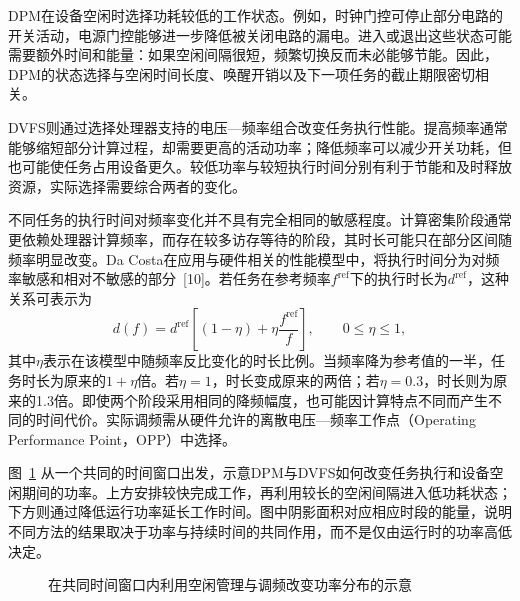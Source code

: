 DPM在设备空闲时选择功耗较低的工作状态。例如，时钟门控可停止部分电路的开关活动，电源门控能够进一步降低被关闭电路的漏电。进入或退出这些状态可能需要额外时间和能量：如果空闲间隔很短，频繁切换反而未必能够节能。因此，DPM的状态选择与空闲时间长度、唤醒开销以及下一项任务的截止期限密切相关。

DVFS则通过选择处理器支持的电压—频率组合改变任务执行性能。提高频率通常能够缩短部分计算过程，却需要更高的活动功率；降低频率可以减少开关功耗，但也可能使任务占用设备更久。较低功率与较短执行时间分别有利于节能和及时释放资源，实际选择需要综合两者的变化。

不同任务的执行时间对频率变化并不具有完全相同的敏感程度。计算密集阶段通常更依赖处理器计算频率，而存在较多访存等待的阶段，其时长可能只在部分区间随频率明显改变。Da Costa在应用与硬件相关的性能模型中，将执行时间分为对频率敏感和相对不敏感的部分~[10]。若任务在参考频率$f^{\mathrm{ref}}$下的执行时长为$d^{\mathrm{ref}}$，这种关系可表示为
\begin{equation}\label{eq:ch2-response}
  d(f)=d^{\mathrm{ref}}\left[(1-\eta)+\eta\frac{f^{\mathrm{ref}}}{f}\right],
  \qquad 0\le\eta\le1,
\end{equation}
其中$\eta$表示在该模型中随频率反比变化的时长比例。当频率降为参考值的一半，任务时长为原来的$1+\eta$倍。若$\eta=1$，时长变成原来的两倍；若$\eta=0.3$，时长则为原来的1.3倍。即使两个阶段采用相同的降频幅度，也可能因计算特点不同而产生不同的时间代价。实际调频需从硬件允许的离散电压—频率工作点（Operating Performance Point，OPP）中选择。

图~\ref{fig:ch2_power_control} 从一个共同的时间窗口出发，示意DPM与DVFS如何改变任务执行和设备空闲期间的功率。上方安排较快完成工作，再利用较长的空闲间隔进入低功耗状态；下方则通过降低运行功率延长工作时间。图中阴影面积对应相应时段的能量，说明不同方法的结果取决于功率与持续时间的共同作用，而不是仅由运行时的功率高低决定。

\begin{figure}[htbp]
  \centering
  \caption{在共同时间窗口内利用空闲管理与调频改变功率分布的示意}
  \label{fig:ch2_power_control}
\end{figure}

